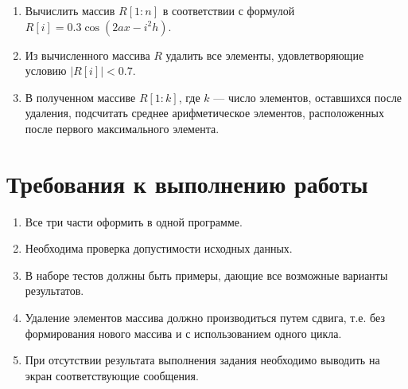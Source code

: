 \begin{enumerate}
    \item Вычислить массив \(R[1{:}n]\) в соответствии с формулой \(R[i] = 0.3\cos(2ax - i^2h)\).
    \item Из вычисленного массива \(R\) удалить все элементы, удовлетворяющие условию \(\vert R[i] \vert < 0.7\).
    \item В полученном массиве \(R[1{:}k]\), где \(k\) --- число элементов, оставшихся после удаления, подсчитать среднее арифметическое элементов, расположенных после первого максимального элемента.  
\end{enumerate}
\section*{\hfil Требования к выполнению работы \hfil}
\begin{enumerate}
    \item Все три части оформить в одной программе.
    \item Необходима проверка допустимости исходных данных.
    \item В наборе тестов должны быть примеры, дающие все возможные варианты результатов.
    \item Удаление элементов массива должно производиться путем сдвига, т.е. без
    формирования нового массива и с использованием одного цикла.
    \item При отсутствии результата выполнения задания необходимо выводить на экран
    соответствующие сообщения.
\end{enumerate}
